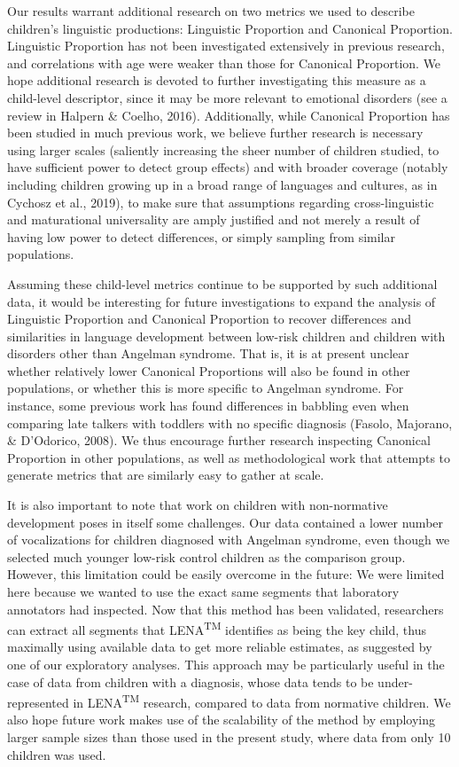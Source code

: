 \documentclass[english,,man]{apa6}
\begin{document}
Our results warrant additional research on two metrics we used to describe children's linguistic productions: Linguistic Proportion and Canonical Proportion. Linguistic Proportion has not been investigated extensively in previous research, and correlations with age were weaker than those for Canonical Proportion. We hope additional research is devoted to further investigating this measure as a child-level descriptor, since it may be more relevant to emotional disorders (see a review in Halpern \& Coelho, 2016). Additionally, while Canonical Proportion has been studied in much previous work, we believe further research is necessary using larger scales (saliently increasing the sheer number of children studied, to have sufficient power to detect group effects) and with broader coverage (notably including children growing up in a broad range of languages and cultures, as in Cychosz et al., 2019), to make sure that assumptions regarding cross-linguistic and maturational universality are amply justified and not merely a result of having low power to detect differences, or simply sampling from similar populations.

Assuming these child-level metrics continue to be supported by such additional data, it would be interesting for future investigations to expand the analysis of Linguistic Proportion and Canonical Proportion to recover differences and similarities in language development between low-risk children and children with disorders other than Angelman syndrome. That is, it is at present unclear whether relatively lower Canonical Proportions will also be found in other populations, or whether this is more specific to Angelman syndrome. For instance, some previous work has found differences in babbling even when comparing late talkers with toddlers with no specific diagnosis (Fasolo, Majorano, \& D'Odorico, 2008). We thus encourage further research inspecting Canonical Proportion in other populations, as well as methodological work that attempts to generate metrics that are similarly easy to gather at scale.

It is also important to note that work on children with non-normative development poses in itself some challenges. Our data contained a lower number of vocalizations for children diagnosed with Angelman syndrome, even though we selected much younger low-risk control children as the comparison group. However, this limitation could be easily overcome in the future: We were limited here because we wanted to use the exact same segments that laboratory annotators had inspected. Now that this method has been validated, researchers can extract all segments that LENA\textsuperscript{TM} identifies as being the key child, thus maximally using available data to get more reliable estimates, as suggested by one of our exploratory analyses. This approach may be particularly useful in the case of data from children with a diagnosis, whose data tends to be under-represented in LENA\textsuperscript{TM} research, compared to data from normative children. We also hope future work makes use of the scalability of the method by employing larger sample sizes than those used in the present study, where data from only 10 children was used.
\end{document}
